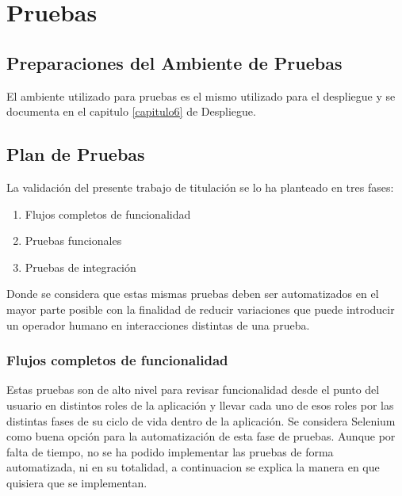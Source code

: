 
\chapter{Pruebas}
\label{capitulo5}

\section{Preparaciones del Ambiente de Pruebas}
El ambiente utilizado para pruebas es el mismo utilizado para el despliegue y se documenta en el capitulo \ref{capitulo6} de Despliegue.

\section{Plan de Pruebas}
La validación del presente trabajo de titulación se lo ha planteado en tres fases:
\begin{enumerate}
  \item Flujos completos de funcionalidad
  \item Pruebas funcionales
  \item Pruebas de integración
\end{enumerate}
Donde se considera que estas mismas pruebas deben ser automatizados en el mayor parte posible con la finalidad de reducir variaciones que puede introducir un operador humano en interacciones distintas de una prueba.

\subsection{Flujos completos de funcionalidad}
Estas pruebas son de alto nivel para revisar funcionalidad desde el punto del usuario en distintos roles de la aplicación y llevar cada uno de esos roles por las distintas fases de su ciclo de vida dentro de la aplicación. Se considera Selenium como buena opción para la automatización de esta fase de pruebas. Aunque por falta de tiempo, no se ha podido implementar las pruebas de forma automatizada, ni en su totalidad, a continuacion se explica la manera en que quisiera que se implementan.

